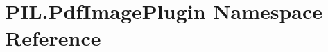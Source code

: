 \hypertarget{namespacePIL_1_1PdfImagePlugin}{}\section{P\+I\+L.\+Pdf\+Image\+Plugin Namespace Reference}
\label{namespacePIL_1_1PdfImagePlugin}
